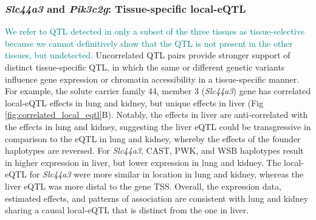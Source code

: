 \documentclass[10pt,letterpaper]{article}
\newcommand{\GKinline}[1]{\textcolor{teal}{#1}}
\begin{document}
\subsubsection*{\textit{Slc44a3} and \textit{Pik3c2g}: Tissue-specific local-eQTL}
\GKinline{We refer to QTL detected in only a subset of the three tissues as tissue-selective because we cannot definitively show that the QTL is not present in the other tissues, but undetected.}
Uncorrelated QTL pairs provide stronger support of distinct tissue-specific QTL, in which the same or different genetic variants influence gene expression or chromatin accessibility in a tissue-specific manner. For example, the solute carrier family 44, member 3 (\textit{Slc44a3}) gene has correlated local-eQTL effects in lung and kidney, but unique effects in liver (Fig \ref{fig:correlated_local_eqtl}B). Notably, the effects in liver are anti-correlated with the effects in lung and kidney, suggesting the liver eQTL could be transgressive \cite{Rieseberg1999} in comparison to the eQTL in lung and kidney, whereby the effects of the founder haplotypes are reversed. For \textit{Slc44a3}, CAST, PWK, and WSB haplotypes result in higher expression in liver, but lower expression in lung and kidney. 
The local-eQTL for \textit{Slc44a3} were more similar in location in lung and kidney, whereas the liver eQTL was more distal to the gene TSS. Overall, the expression data, estimated effects, and patterns of association are consistent with lung and kidney sharing a causal local-eQTL that is distinct from the one in liver. 
\end{document}
